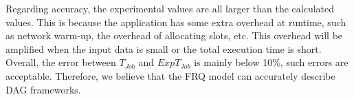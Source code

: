 {%

Regarding accuracy, the experimental values are all larger than the calculated values. This is because the application has some extra overhead at runtime, such as network warm-up, the overhead of allocating slots, etc. 
This overhead will be amplified when the input data is small or the total execution time is short. 
Overall, the error between \(T_{Job}\) and \(ExpT_{Job}\) is mainly below 10\%, such errors are acceptable. Therefore, we believe that the FRQ model can accurately describe DAG frameworks.
}